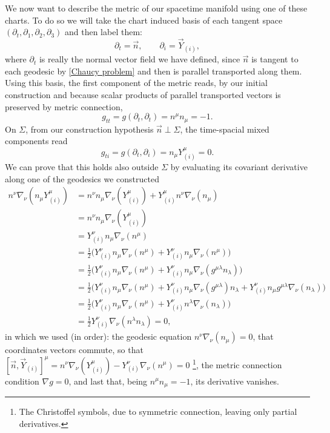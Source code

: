 We now want to describe the metric of our spacetime manifold using one of these charts. To do so we will take the chart induced basis of each tangent space $(\partial_t,\partial_1,\partial_2,\partial_3)$ and then label them:
\begin{equation}
    \partial_t=\vec n,\qquad \partial_i= \vec Y_{(i)},
\end{equation}
where $\partial_t$ is really the normal vector field we have defined, since $\vec n$ is tangent to each geodesic by \eqref{Chaucy problem} and then is parallel transported along them.\\
Using this basis, the first component of the metric reads, by our initial construction and because scalar products of parallel transported vectors is preserved by metric connection,
\begin{equation}
    g_{tt}=g(\partial_t,\partial_t)=n^\mu n_\mu=-1.\label{gen gtt}
\end{equation} 
On $\Sigma$, from our construction hypothesis $\vec{n}\perp\Sigma $, the time-spacial mixed components read 
\begin{equation}
    g_{ti}=g(\partial_t,\partial_i)=n_\mu Y^\mu_{(i)}=0.\label{gen gti}
\end{equation} 
We can prove that this holds also outside $\Sigma$ by evaluating its covariant derivative along one of the geodesics we constructed
\begin{align*}
    n^\nu\nabla_\nu(n_\mu Y_{(i)}^\mu)&=n^\nu n_\mu \nabla_\nu( Y_{(i)}^\mu)+Y_{(i)}^\mu n^\nu  \nabla_\nu(n_\mu )\\
    &=n^\nu n_\mu \nabla_\nu( Y_{(i)}^\mu)\\
    &=Y^\nu_{(i)}n_\mu\nabla_\nu(n^\mu)\\
    &=\frac{1}{2}\big(Y^\nu_{(i)}n_\mu\nabla_\nu(n^\mu)+Y^\nu_{(i)}n_\mu\nabla_\nu(n^\mu)\big)\\
    &=\frac{1}{2}\big(Y^\nu_{(i)}n_\mu\nabla_\nu(n^\mu)+Y^\nu_{(i)}n_\mu\nabla_\nu(g^{\mu\lambda}n_{\lambda})\big)\\
    &=\frac{1}{2}\big(Y^\nu_{(i)}n_\mu\nabla_\nu(n^\mu)+Y^\nu_{(i)}n_\mu\nabla_\nu(g^{\mu\lambda})n_{\lambda}+Y^\nu_{(i)}n_\mu g^{\mu\lambda}\nabla_\nu(n_{\lambda})\big)\\
    &=\frac{1}{2}\big(Y^\nu_{(i)}n_\mu\nabla_\nu(n^\mu)+Y^\nu_{(i)}n^\lambda\nabla_\nu(n_{\lambda})\big)\\
    &=\frac{1}{2}Y^\nu_{(i)}\nabla_\nu(n^\lambda n_\lambda)=0,
\end{align*}
in which we used (in order): the geodesic equation $n^\nu  \nabla_\nu(n_\mu )=0$, that coordinates vectors commute, so that $[\vec n,\vec Y_{(i)}]^\mu=n^\nu \nabla_\nu( Y_{(i)}^\mu)-Y^\nu_{(i)}\nabla_\nu(n^\mu)=0$ \footnote{The Christoffel symbols, due to symmetric connection, leaving only partial derivatives.}, the metric connection condition $\nabla g=0$, and last that, being $n^\mu n_\mu=-1$, its derivative vanishes.\\

